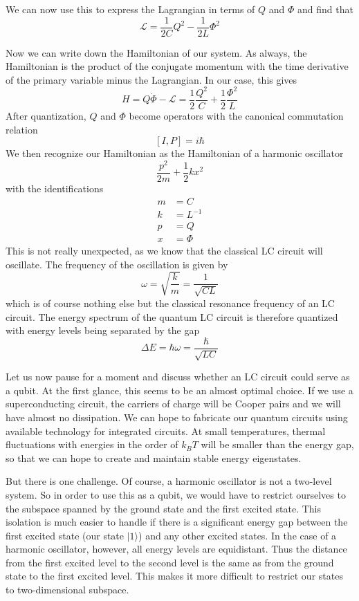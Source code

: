 \documentclass[a4paper, draft]{article}
\theoremstyle{own}
\theoremstyle{remark}
\begin{document}
We can now use this to express the Lagrangian in terms of $Q$ and $\Phi$ and find that
$$
{\mathcal L} = \frac{1}{2C}  Q^2 - \frac{1}{2L} \Phi^2 
$$

Now we can write down the Hamiltonian of our system. As always, the Hamiltonian is the product of the conjugate momentum with the time derivative of the primary variable minus the Lagrangian. In our case, this gives
$$
H = Q\dot{\Phi} - {\mathcal L} = \frac{1}{2} \frac{Q^2}{C} + \frac{1}{2} \frac{\Phi^2}{L}
$$
After quantization, $Q$ and $\Phi$ become operators with the canonical commutation relation
$$
[I,P] = i \hbar
$$
We then recognize our Hamiltonian as the Hamiltonian of a harmonic oscillator
$$
\frac{p^2}{2m} + \frac{1}{2}kx^2
$$
with the identifications
\begin{align*}
m &= C \\
k &= L^{-1} \\
p &= Q \\
x &= \Phi
\end{align*}
This is not really unexpected, as we know that the classical LC circuit will oscillate. The frequency of the oscillation is given by
$$
\omega = \sqrt{\frac{k}{m}} =  \frac{1}{\sqrt{CL}}
$$
which is of course nothing else but the classical resonance frequency of an LC circuit. The energy spectrum of the quantum LC circuit is therefore quantized with energy levels being separated by the gap
$$
\Delta E = \hbar \omega = \frac{\hbar}{\sqrt{LC}}
$$

Let us now pause for a moment and discuss whether an LC circuit could serve as a qubit. At the first glance, this seems to be an almost optimal choice. If we use a superconducting circuit, the carriers of charge will be Cooper pairs and we will have almost no dissipation. We can hope to fabricate our quantum circuits using available technology for integrated circuits. At small temperatures, thermal fluctuations with energies in the order of $k_B T$ will be smaller than the energy gap, so that we can hope to create and maintain stable energy eigenstates.

But there is one challenge. Of course, a harmonic oscillator is not a two-level system. So in order to use this as a qubit, we would have to restrict ourselves to the subspace spanned by the ground state and the first excited state. This isolation is much easier to handle if there is a significant energy gap between the first excited state (our state $|1\rangle$) and any other excited states. In the case of a harmonic oscillator, however, all energy levels are equidistant. Thus the distance from the first excited level to the second level is the same as from the ground state to the first excited level. This makes it more difficult to restrict our states to two-dimensional subspace. 
\end{document}
